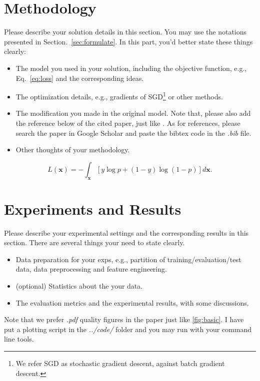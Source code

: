 \documentclass{article}
\newcommand{\bs}{\boldsymbol}
\begin{document}
\section{Methodology}\label{sec:method}
Please describe your solution details in this section.
You may use the notations presented in Section.~\ref{sec:formulate}.
In this part, you'd better state these things clearly:
\begin{itemize}
	\item The model you used in your solution, including the objective function, e.g., Eq.~\ref{eq:loss} and the corresponding ideas.
	\item The optimization details, e.g., gradients of SGD\footnote{We refer SGD as stochastic gradient descent, against batch gradient descent.} or other methods.
	\item The modification you made in the original model. Note that, please also add the reference below of the cited paper, just like \cite{zhang2014optimal}. As for references, please search the paper in Google Scholar and paste the bibtex code in the \textit{.bib} file.
	\item Other thoughts of your methodology.
\end{itemize}

\begin{equation}\label{eq:loss}
	L(\bs{x}) = - \int_{\bs{x}} [y \log{p} + (1-y) \log{(1-p)}] d\bs{x} .
\end{equation}

\section{Experiments and Results}\label{sec:exps}
Please describe your experimental settings and the corresponding results in this section.
There are several things your need to state clearly.
\begin{itemize}
	\item Data preparation for your exps, e.g., partition of training/evaluation/test data, data preprocessing and feature engineering.
	\item (optional) Statistics about the your data.
	\item The evaluation metrics and the experimental results, with some discussions.
\end{itemize}
Note that we prefer \textit{.pdf} quality figures in the paper just like \ref{fig:basic}.
I have put a plotting script in the \textit{../code/} folder and you may run with your command line tools.
\end{document}
